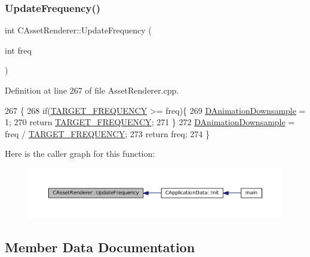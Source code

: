 \subsubsection{\texorpdfstring{Update\+Frequency()}{UpdateFrequency()}}
{\footnotesize\ttfamily int C\+Asset\+Renderer\+::\+Update\+Frequency (\begin{DoxyParamCaption}\item[{int}]{freq }\end{DoxyParamCaption})\hspace{0.3cm}{\ttfamily [static]}}



Definition at line 267 of file Asset\+Renderer.\+cpp.


\begin{DoxyCode}
267                                            \{
268     \textcolor{keywordflow}{if}(\hyperlink{AssetRenderer_8cpp_a0d86e657ae1200c5ec796a3f31e36d49}{TARGET\_FREQUENCY} >= freq)\{
269         \hyperlink{classCAssetRenderer_a13ea9a19837c39e57db499f53366c5b8}{DAnimationDownsample} = 1;
270         \textcolor{keywordflow}{return} \hyperlink{AssetRenderer_8cpp_a0d86e657ae1200c5ec796a3f31e36d49}{TARGET\_FREQUENCY};   
271     \}
272     \hyperlink{classCAssetRenderer_a13ea9a19837c39e57db499f53366c5b8}{DAnimationDownsample} = freq / \hyperlink{AssetRenderer_8cpp_a0d86e657ae1200c5ec796a3f31e36d49}{TARGET\_FREQUENCY};
273     \textcolor{keywordflow}{return} freq;
274 \}
\end{DoxyCode}
Here is the caller graph for this function\+:\nopagebreak
\begin{figure}[H]
\begin{center}
\leavevmode
\includegraphics[width=350pt]{classCAssetRenderer_a06e45891dcbc0a88570c537a4d6906c8_icgraph}
\end{center}
\end{figure}


\subsection{Member Data Documentation}
\hypertarget{classCAssetRenderer_a13ea9a19837c39e57db499f53366c5b8}{}\label{classCAssetRenderer_a13ea9a19837c39e57db499f53366c5b8} 
